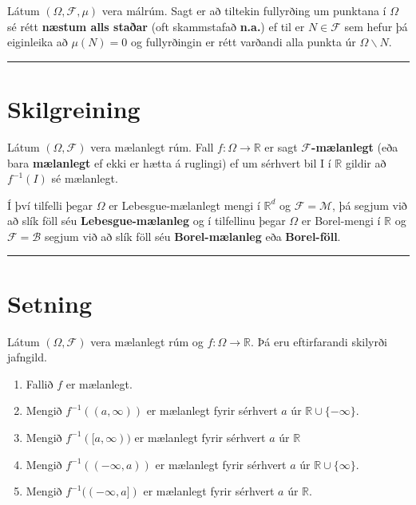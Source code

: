 \documentclass[]{book}
\begin{document}
Látum \((\Omega, \mathcal F, \mu)\) vera málrúm. Sagt er að tiltekin fullyrðing um punktana í \(\Omega\) sé rétt \textbf{næstum alls staðar} (oft skammstafað \textbf{n.a.}) ef til er \(N \in \mathcal F\) sem hefur þá eiginleika að \(\mu(N) = 0\) og fullyrðingin er rétt varðandi alla punkta úr \(\Omega \backslash N\).

\begin{center}\rule{0.5\linewidth}{\linethickness}\end{center}

\hypertarget{skilgreining-14}{%
\section{Skilgreining}\label{skilgreining-14}}

Látum \((\Omega, \mathcal F)\) vera mælanlegt rúm. Fall \(f: \Omega \rightarrow \mathbb R\) er sagt \(\mathcal F\)\textbf{-mælanlegt} (eða bara \textbf{mælanlegt} ef ekki er hætta á ruglingi) ef um sérhvert bil I í \(\mathbb R\) gildir að \(f^{-1}(I)\) sé mælanlegt.

Í því tilfelli þegar \(\Omega\) er Lebesgue-mælanlegt mengi í \(\mathbb R^d\) og \(\mathcal F = \mathcal M\), þá segjum við að slík föll séu \textbf{Lebesgue-mælanleg} og í tilfellinu þegar \(\Omega\) er Borel-mengi í \(\mathbb R\) og \(\mathcal F = \mathcal B\) segjum við að slík föll séu \textbf{Borel-mælanleg} eða \textbf{Borel-föll}.

\begin{center}\rule{0.5\linewidth}{\linethickness}\end{center}

\hypertarget{setning-32}{%
\section{Setning}\label{setning-32}}

Látum \((\Omega, \mathcal F)\) vera mælanlegt rúm og \(f: \Omega \rightarrow \mathbb R\). Þá eru eftirfarandi skilyrði jafngild.

\begin{enumerate}
\def\labelenumi{\arabic{enumi}.}
\item
  Fallið \(f\) er mælanlegt.
\item
  Mengið \(f^{-1}((a, \infty))\) er mælanlegt fyrir sérhvert \(a\) úr \(\mathbb R \cup \{-\infty\}\).
\item
  Mengið \(f^{-1}([a, \infty))\) er mælanlegt fyrir sérhvert \(a\) úr \(\mathbb R\)
\item
  Mengið \(f^{-1}((-\infty, a))\) er mælanlegt fyrir sérhvert \(a\) úr \(\mathbb R \cup \{\infty\}\).
\item
  Mengið \(f^{-1}((-\infty, a])\) er mælanlegt fyrir sérhvert \(a\) úr \(\mathbb R\).
\end{enumerate}
\end{document}
